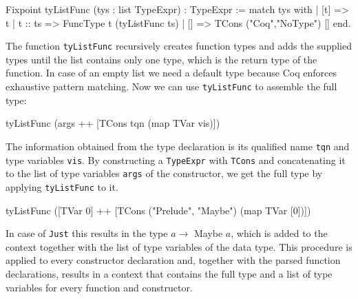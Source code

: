 \documentclass[fleqn, abstract=on]{scrreprt}
\newcommand{\coqinline}[1]{\texttt{#1}}
\begin{document}
\begin{coqcode}
Fixpoint tyListFunc (tys : list TypeExpr) : TypeExpr :=
  match tys with
  | [t]     => t
  | t :: ts => FuncType t (tyListFunc ts)
  | []      => TCons ("Coq","NoType") []
  end.
\end{coqcode}
The function \coqinline{tyListFunc} recursively creates function types and adds the supplied types until the list contains only one type, which is the return type of the function. In case of an empty list we need a default type because Coq enforces exhaustive pattern matching. Now we can use \coqinline{tyListFunc} to assemble the full type:
\begin{coqcode}
tyListFunc (args ++ [TCons tqn (map TVar vis)])
\end{coqcode}
The information obtained from the type declaration is its qualified name \texttt{tqn} and type variables \texttt{vis}. By constructing a \coqinline{TypeExpr} with \coqinline{TCons} and concatenating it to the list of type variables \texttt{args} of the constructor, we get the full type by applying \coqinline{tyListFunc} to it.
\begin{coqcode}
tyListFunc ([TVar 0] ++ [TCons ("Prelude", "Maybe") (map TVar [0])])
\end{coqcode} 
In case of \texttt{Just} this results in the type $a \rightarrow$ Maybe $a$, which is added to the context together with the list of type variables of the data type. This procedure is applied to every constructor declaration and, together with the parsed function declarations, results in a context that contains the full type and a list of type variables for every function and constructor.
\end{document}
